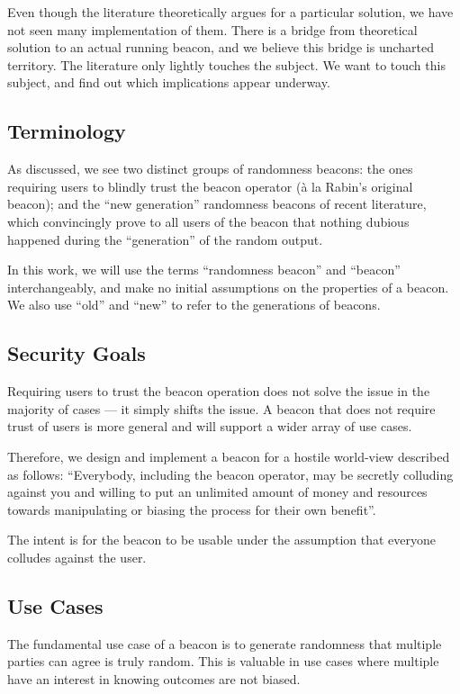 Even though the literature theoretically argues for a particular solution, we have not seen many implementation of them. There is a bridge from theoretical solution to an actual running beacon, and we believe this bridge is uncharted territory. The literature only lightly touches the subject. We want to touch this subject, and find out which implications appear underway.

\subsection{Terminology}
As discussed, we see two distinct groups of randomness beacons: the ones requiring users to blindly trust the beacon operator (à la Rabin's original beacon); and the \enquote{new generation} randomness beacons of recent literature, which convincingly prove to all users of the beacon that nothing dubious happened during the \enquote{generation} of the random output.

In this work, we will use the terms \enquote{randomness beacon} and \enquote{beacon} interchangeably, and make no initial assumptions on the properties of a beacon. We also use \enquote{old} and \enquote{new} to refer to the generations of beacons. 

\subsection{Security Goals}\label{sec:security_goals}
Requiring users to trust the beacon operation does not solve the issue in the majority of cases --- it simply shifts the issue. A beacon that does not require trust of users is more general and will support a wider array of use cases.

Therefore, we design and implement a beacon for a hostile world-view described as follows:
\enquote{Everybody, including the beacon operator, may be secretly colluding against you and willing to put an unlimited amount of money and resources towards manipulating or biasing the process for their own benefit}.

The intent is for the beacon to be usable under the assumption that everyone colludes against the user.

\subsection{Use Cases}
The fundamental use case of a beacon is to generate randomness that multiple parties can agree is truly random. This is valuable in use cases where multiple have an interest in knowing outcomes are not biased.

